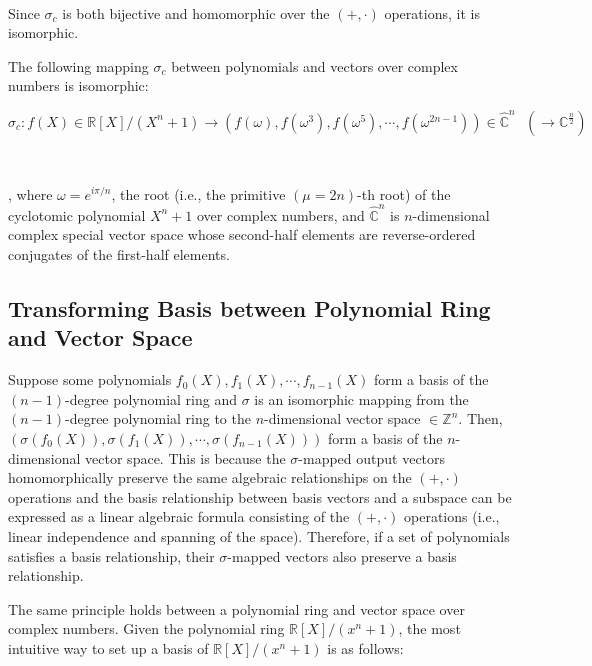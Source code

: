 $ $

Since $\sigma_c$ is both bijective and homomorphic over the $(+, \cdot)$ operations, it is isomorphic. 


\begin{tcolorbox}[title={\textbf{\tboxtheorem{\ref*{subsec:poly-vector-transformation-complex}} Isomorphism between Polynomials and Vectors over Complex Numbers}}]

The following mapping $\sigma_c$ between polynomials and vectors over complex numbers is isomorphic:

$\sigma_c: f(X) \in \mathbb{R}[X]/(X^n + 1) \longrightarrow (f(\omega),f(\omega^3),f(\omega^5), \cdots, f(\omega^{2n-1})) \in \mathbb{\hat{C}}^{n} \text{ } (\longrightarrow \mathbb{C}^{\frac{n}{2}})$

$ $

, where $\omega = e^{i\pi/n}$, the root (i.e., the primitive $(\mu=2n)$-th root) of the cyclotomic polynomial $X^n + 1$ over complex numbers, and $\mathbb{\hat{C}}^{n}$ is $n$-dimensional complex special vector space whose second-half elements are reverse-ordered conjugates of the first-half elements. 

\end{tcolorbox}


\subsection{Transforming Basis between Polynomial Ring and Vector Space}
\label{subsec:poly-vector-basis-transfer}


Suppose some polynomials $f_0(X), f_1(X), \cdots, f_{n-1}(X)$ form a basis of the $(n-1)$-degree polynomial ring and $\sigma$ is an isomorphic mapping from the $(n-1)$-degree polynomial ring to the $n$-dimensional vector space $\in \mathbb{Z}^n$. Then, $(\sigma(f_0(X)), \sigma(f_1(X)), \cdots, \sigma(f_{n-1}(X)))$ form a basis of the $n$-dimensional vector space. This is because the $\sigma$-mapped output vectors homomorphically preserve the same algebraic relationships on the $(+, \cdot)$ operations and the basis relationship between basis vectors and a subspace can be expressed as a linear algebraic formula consisting of the $(+, \cdot)$ operations (i.e., linear independence and spanning of the space). Therefore, if a set of polynomials satisfies a basis relationship, their $\sigma$-mapped vectors also preserve a basis relationship.

The same principle holds between a polynomial ring and vector space over complex numbers. Given the polynomial ring $\mathbb{R}[X]/(x^n + 1)$, the most intuitive way to set up a basis of $\mathbb{R}[X]/(x^n + 1)$ is as follows:

